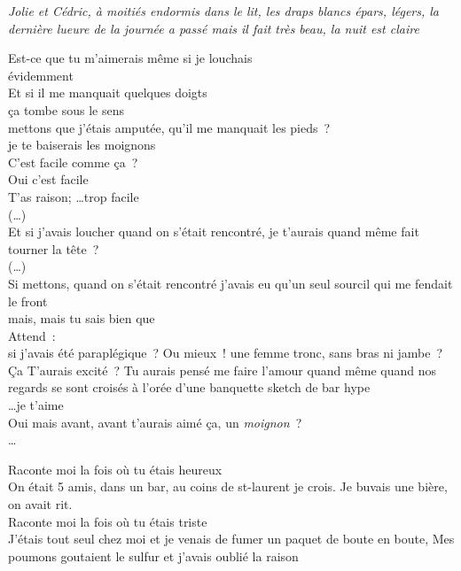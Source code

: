  \textit{Jolie et Cédric, à moitiés endormis dans le lit, les
draps blancs épars, légers, la dernière lueure de la journée a passé
mais il fait très beau, la nuit est claire}

Est-ce que tu m’aimerais même si je louchais\\[2ex]
évidemment\\[2ex]
Et si il me manquait quelques doigts\\[2ex]
ça tombe sous le sens\\[2ex]
mettons que j’étais amputée, qu’il me manquait les pieds ?\\[2ex]
je te baiserais les moignons\\[2ex]
C’est facile comme ça ?\\[2ex]
Oui c’est facile\\[2ex]
T’as raison; \ldots trop facile\\[2ex]
(…)\\[2ex]
Et si j’avais loucher quand on s’était rencontré, je t’aurais quand même fait tourner la tête ?\\[2ex]
(…)\\[2ex]
Si mettons, quand on s’était rencontré j'avais eu qu’un seul sourcil qui me
fendait le front\\[2ex]
mais, mais tu sais bien que\\[2ex]
Attend :\\
si j’avais été paraplégique ? Ou mieux ! une femme tronc, sans bras ni
jambe ? Ça T’aurais excité ? Tu aurais pensé me faire l’amour quand même quand
nos regards se sont croisés à l’orée d’une banquette sketch de bar hype\\[2ex]

\ldots je t’aime\\[2ex]
Oui mais avant, avant t’aurais aimé ça, un \textit{moignon} ? \\[2ex]

\ldots

Raconte moi la fois où tu étais heureux\\[2ex]
On était 5 amis, dans un bar, au coins de st-laurent je crois.
Je buvais une bière, on avait rit.\\[2ex]
Raconte moi la fois où tu étais triste\\[2ex]
J'étais tout seul chez moi et je venais de fumer
un paquet de boute en boute, Mes poumons goutaient le sulfur
et j'avais oublié la raison
